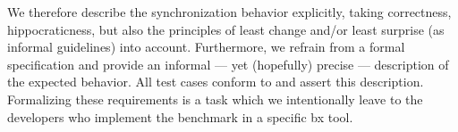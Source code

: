 We therefore describe the synchronization behavior explicitly, taking correctness, hippocraticness, but also the principles of least change and/or least surprise (as informal guidelines) into account. Furthermore, we refrain from a formal specification and provide an informal --- yet (hopefully) precise --- description of the expected behavior.
All test cases conform to and assert this description.
Formalizing these requirements is a task which we intentionally leave to the developers who implement the benchmark in a specific bx tool. 



%
%
%
